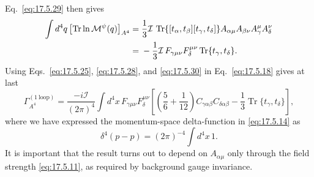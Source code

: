Eq.~\eqref{eq:17.5.29} then gives
\begin{align}
\int d^4q\left[\operatorname{Tr}\ln\mathcal M^\psi(q)\right]_{A^4}
={}&\frac13\mathcal I\,\operatorname{Tr}
\{[t_\alpha,t_\beta][t_\gamma,t_\delta]\}
A_{\alpha\mu}A_{\beta\nu}A_\gamma^\mu A_\delta^\nu
\notag\\
={}&-\frac13\mathcal I\,F_{\gamma\mu\nu}F_\delta^{\mu\nu}
\operatorname{Tr}\{t_\gamma,t_\delta\}.
\label{eq:17.5.30}
\end{align}
Using Eqs.~\eqref{eq:17.5.25}, \eqref{eq:17.5.28}, and
\eqref{eq:17.5.30} in Eq.~\eqref{eq:17.5.18} gives at last
\begin{equation}
\Gamma_{A^4}^{(1\ \mathrm{loop})}
=\frac{-i\mathcal I}{(2\pi)^4}\int d^4x\,F_{\gamma\mu\nu}F_\delta^{\mu\nu}
\left[\left(\frac56+\frac1{12}\right)
C_{\gamma\alpha\beta}C_{\delta\alpha\beta}
-\frac13\operatorname{Tr}\{t_\gamma,t_\delta\}\right],
\label{eq:17.5.31}
\end{equation}
where we have expressed the momentum-space delta-function in
\eqref{eq:17.5.14} as
\begin{equation}
\delta^4(p-p)=(2\pi)^{-4}\int d^4x\,1.
\label{eq:17.5.32}
\end{equation}
It is important that the result turns out to depend on $A_{\alpha\mu}$ only
through the field strength \eqref{eq:17.5.11}, as required by background
gauge invariance.

